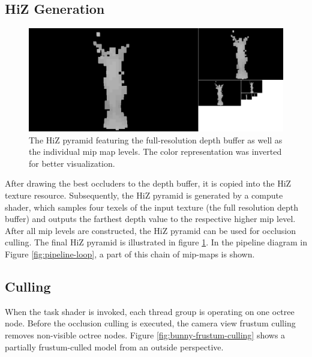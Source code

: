 \subsection*{HiZ Generation} \label{subsec-highz-generation}

\begin{figure}[!htb]
    \centering
    \includegraphics[width=\linewidth]{images/graphics/lucy-hiz-pyramid-inverted.jpg}
    \caption{The \ac{HiZ} pyramid featuring the full-resolution depth buffer as well as the individual mip map 
    levels. The color representation was inverted for better visualization.}
    \label{fig:lucy-hiz-pyramid}
\end{figure}

\noindent
After drawing the best occluders to the depth buffer, it is copied into the \ac{HiZ} texture resource. Subsequently, 
the \ac{HiZ} pyramid is generated by a compute shader, which samples four texels of the input texture (the full resolution 
depth buffer) and outputs the farthest depth value to the respective higher mip level. After all mip levels are constructed, 
the \ac{HiZ} pyramid can be used for occlusion culling. The final \ac{HiZ} pyramid is illustrated in figure 
\ref{fig:lucy-hiz-pyramid}. In the pipeline diagram in Figure \ref{fig:pipeline-loop}, a part of this chain of mip-maps is shown.

\subsection*{Culling} \label{subsec-task-shader}

When the task shader is invoked, each thread group is operating on one octree node. Before the 
occlusion culling is executed, the camera view frustum culling removes non-visible octree nodes. 
Figure \ref{fig:bunny-frustum-culling} shows a partially frustum-culled model from an outside 
perspective. \\

